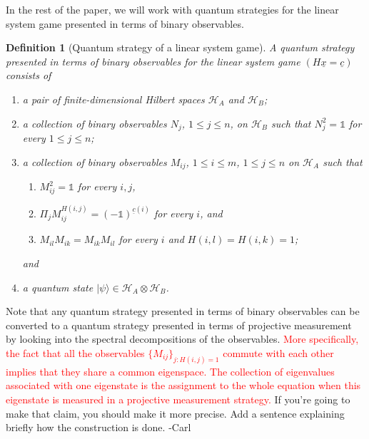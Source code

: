 \documentclass[11pt,letterpaper]{article}
\newcommand{\ket}[1]{|#1\rangle}
\newcommand{\x}{\otimes}
\newcommand{\calH}{\mathcal{H}}
\newcommand{\1}{\mathbb{1}}
\newcommand{\ux}{\underline{x}}
\newcommand{\uc}{\underline{c}}
\def\carl#1{{\color{blue} #1 -Carl}}
\newcommand{\hf}[1]{\textcolor{red}{#1}}
\newtheorem{definition}[theorem]{Definition}
\theoremstyle{definition}
\begin{document}
In the rest of the paper, we will work with quantum strategies for the linear system game presented in terms of binary observables.
\begin{definition}[Quantum strategy of a linear system game]
\label{def:q_strat}
A quantum strategy presented in terms of binary observables for the linear system game $(H\ux = \uc)$ consists of 
\begin{enumerate}
	\item a pair of finite-dimensional Hilbert spaces $\calH_A$ and $\calH_B$; 
	\item a collection of binary observables $N_j$, $1 \leq j \leq n$, on $\calH_B$
	such that $N_j^2 = \1$ for every $1 \leq j \leq n$; 
	\item a collection of binary observables $M_{ij}$, $1\leq i \leq m$, $1\leq j\leq n$ 
	on $\calH_A$ such that 
	\begin{enumerate}
		\item $M_{ij}^2 = \1$ for every $i,j$,
		\item $\Pi_j M_{ij}^{H(i,j)} = (-\1)^{\uc(i)}$ for every $i$, and
		\item $M_{il}M_{ik} = M_{ik}M_{il}$ for every $i$ and $H(i,l) = H(i,k) =1$;
	\end{enumerate} 
	and
	\item a quantum state $\ket{\psi} \in \calH_A \x \calH_B$.
\end{enumerate}
\end{definition}
Note that any quantum strategy presented in terms of binary observables can be 
converted to a quantum strategy presented in terms of projective measurement by looking into
the spectral decompositions of the observables. 
\hf{More specifically, the fact that all the observables $\{M_{ij}\}_{j: H(i,j) = 1}$ commute with each other
implies that they share a common eigenspace. The collection of eigenvalues associated with one eigenstate is the assignment
to the whole equation when this eigenstate is measured in a projective measurement strategy.}
 \carl{If you're going to make that claim, you should make it more precise.  Add a sentence explaining briefly how the construction is done.}
\end{document}
